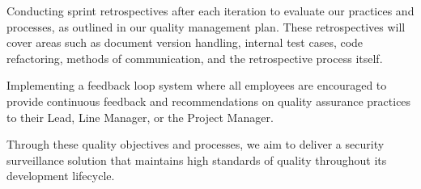 Conducting sprint retrospectives after each iteration to evaluate our practices and processes, as outlined in our quality management plan. These retrospectives will cover areas such as document version handling, internal test cases, code refactoring, methods of communication, and the retrospective process itself.

Implementing a feedback loop system where all employees are encouraged to provide continuous feedback and recommendations on quality assurance practices to their Lead, Line Manager, or the Project Manager.

Through these quality objectives and processes, we aim to deliver a security surveillance solution that maintains high standards of quality throughout its development lifecycle.